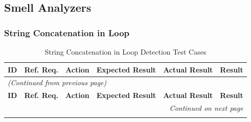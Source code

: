 \documentclass[12pt, titlepage]{article}
\begin{document}
\subsection{Smell Analyzers}

\subsubsection{String Concatenation in Loop}

\begin{longtable}{c
    >{\raggedright\arraybackslash}p{1.5cm}
    >{\raggedright\arraybackslash}p{4.5cm}
    >{\raggedright\arraybackslash}p{4cm}
  >{\raggedright\arraybackslash}p{3cm} c}
  \toprule
  \textbf{ID} & \textbf{Ref. Req.} & \textbf{Action} &
  \textbf{Expected Result} & \textbf{Actual Result} & \textbf{Result} \\
  \midrule
  \endfirsthead

  \multicolumn{6}{l}{\textit{(Continued from previous page)}} \\
  \toprule
  \textbf{ID} & \textbf{Ref. Req.} & \textbf{Action} &
  \textbf{Expected Result} & \textbf{Actual Result} & \textbf{Result} \\
  \midrule
  \endhead

  \multicolumn{6}{r}{\textit{Continued on next page}} \\
  \endfoot

  \bottomrule
  \caption{String Concatenation in Loop Detection Test Cases}
  \label{table:string_concat_detection_tests}
  \endlastfoot


\end{longtable}
\end{document}
